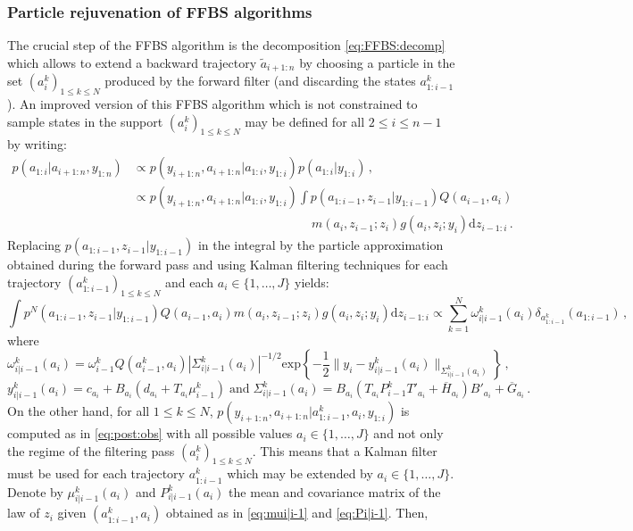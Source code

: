 \documentclass[nolayout]{article}
\theoremstyle{plain}
\theoremstyle{definition}
\newcommand{\1}{\mathbbm{1}}
\def\rmd{\mathrm{d}}
\def\barG{\overline{G}}
\def\barH{\overline{H}}
\def\eqsp{\,}
\begin{document}
\subsubsection{Particle rejuvenation of FFBS algorithms}
The crucial step of the FFBS algorithm is the decomposition \eqref{eq:FFBS:decomp} which allows to extend a backward trajectory $\tilde{a}_{i+1:n}$ by choosing a particle in the set $(a_i^k)_{1\le k \le N}$ produced by the forward filter (and discarding the states $a^k_{1:i-1}$). An improved version of this FFBS algorithm which is not constrained to sample states in the support $(a_i^k)_{1\le k \le N}$ may be defined for all $2\le i\le n-1$ by writing:
\begin{align*}
p(a_{1:i}|a_{i+1:n},y_{1:n}) &\propto p(y_{i+1:n},a_{i+1:n}|a_{1:i},y_{1:i})p(a_{1:i}|y_{1:i})\eqsp,\\
&\propto p(y_{i+1:n},a_{i+1:n}|a_{1:i},y_{1:i})\int p(a_{1:i-1},z_{i-1}|y_{1:i-1})Q(a_{i-1},a_i)\\
&\hspace{6cm}m(a_i,z_{i-1};z_i)g(a_i,z_i;y_i)\rmd z_{i-1:i}\eqsp.
\end{align*}
Replacing $p(a_{1:i-1},z_{i-1}|y_{1:i-1})$ in the integral by the particle approximation obtained during the forward pass and using Kalman filtering techniques for each trajectory $(a^k_{1:i-1})_{1\le k\le N}$ and each $a_i\in\{1,\ldots,J\}$ yields:
\[
\int p^N(a_{1:i-1},z_{i-1}|y_{1:i-1})Q(a_{i-1},a_i)m(a_i,z_{i-1};z_i)g(a_i,z_i;y_i)\rmd z_{i-1:i} \propto \sum_{k=1}^N \omega_{i|i-1}^k(a_i)\delta_{a^k_{1:i-1}}(a_{1:i-1})\eqsp,
\]
where
\[
\omega_{i|i-1}^k(a_i) = \omega_{i-1}^k Q(a_{i-1}^k,a_i)|\Sigma^k_{i|i-1}(a_i)|^{-1/2}\mathrm{exp}\left\{-\frac{1}{2}\|y_i - y^k_{i|i-1}(a_i)\|_{\Sigma^k_{i|i-1}(a_i)}\right\}\eqsp,%
\]
\[
y^k_{i|i-1}(a_i) = c_{a_i} + B_{a_i}(d_{a_i}+T_{a_i}\mu^k_{i-1})\;\mbox{and}\; \Sigma^k_{i|i-1}(a_i) = B_{a_i}(T_{a_i}P^k_{i-1}T'_{a_i}+\barH_{a_i})B'_{a_i} + \barG_{a_i}\eqsp.
\]
On the other hand, for all $1\le k \le N$, $p(y_{i+1:n},a_{i+1:n}|a^k_{1:i-1},a_i,y_{1:i})$ is computed as in \eqref{eq:post:obs} with all possible values $a_i\in\{1,\ldots,J\}$ and not only the regime of the filtering pass $(a_i^k)_{1\le k \le N}$. This means that a Kalman filter must be used for each trajectory $a^k_{1:i-1}$ which may be extended by $a_i\in\{1,\ldots,J\}$. Denote by $\mu_{i|i-1}^k(a_i)$ and $P_{i|i-1}^k(a_i)$ the mean and covariance matrix of the law of $z_i$ given $(a^k_{1:i-1},a_i)$ obtained as in \eqref{eq:mui|i-1} and \eqref{eq:Pi|i-1}. Then,
\end{document}

